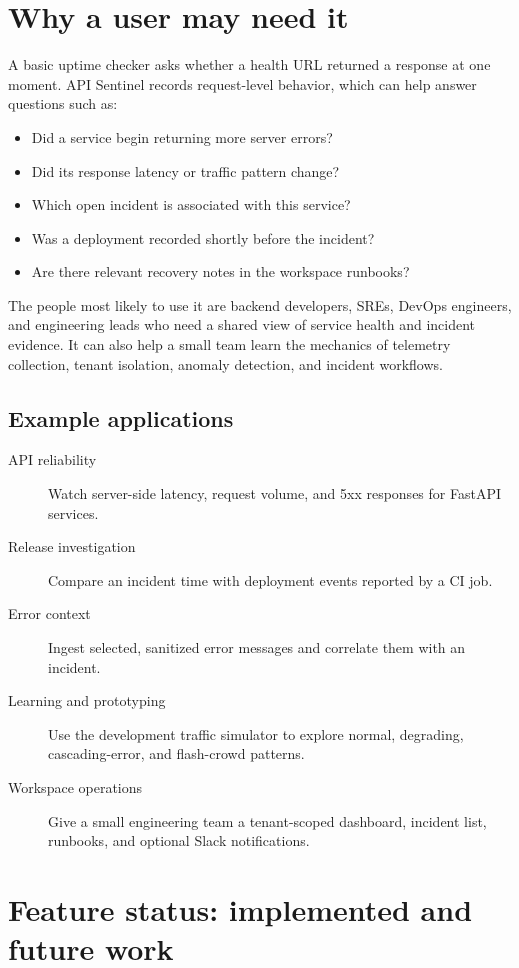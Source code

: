 \documentclass[11pt,a4paper]{article}
\begin{document}
\section{Why a user may need it}

A basic uptime checker asks whether a health URL returned a response at one
moment. API Sentinel records request-level behavior, which can help answer
questions such as:
\begin{itemize}
  \item Did a service begin returning more server errors?
  \item Did its response latency or traffic pattern change?
  \item Which open incident is associated with this service?
  \item Was a deployment recorded shortly before the incident?
  \item Are there relevant recovery notes in the workspace runbooks?
\end{itemize}

The people most likely to use it are backend developers, SREs, DevOps engineers,
and engineering leads who need a shared view of service health and incident
evidence. It can also help a small team learn the mechanics of telemetry
collection, tenant isolation, anomaly detection, and incident workflows.

\subsection{Example applications}
\begin{description}
  \item[API reliability] Watch server-side latency, request volume, and 5xx
  responses for FastAPI services.
  \item[Release investigation] Compare an incident time with deployment events
  reported by a CI job.
  \item[Error context] Ingest selected, sanitized error messages and correlate
  them with an incident.
  \item[Learning and prototyping] Use the development traffic simulator to
  explore normal, degrading, cascading-error, and flash-crowd patterns.
  \item[Workspace operations] Give a small engineering team a tenant-scoped
  dashboard, incident list, runbooks, and optional Slack notifications.
\end{description}

\section{Feature status: implemented and future work}
\end{document}
